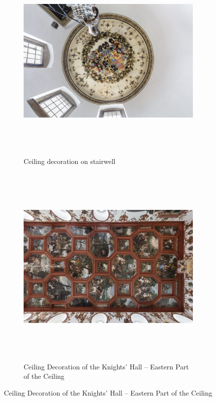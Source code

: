 \documentclass[
  a4paper,
]{book}
\begin{document}
\begin{figure}
\begin{figure}[H]    
  \includegraphics[height=10cm]{images/fmd10005854a.jpg}
  \caption{Ceiling decoration on stairwell}
  \label{fig:{images/fmd10005854a.jpg}}
\end{figure}

\clearpage

\begin{figure}[H]    
  \includegraphics[height=10cm]{images/fmd10005870a.jpg}
  \caption{Ceiling Decoration of the Knights' Hall – Eastern Part of the Ceiling}
  \label{fig:{images/fmd10005870a.jpg}}
\end{figure}

\clearpage


\end{figure}
\end{document}
